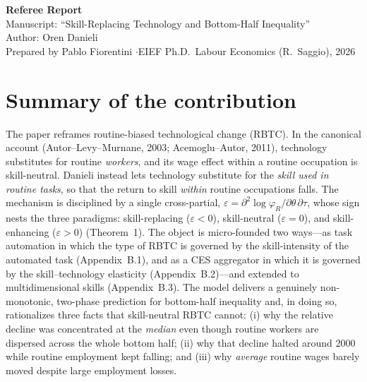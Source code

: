 \documentclass[11pt]{article}
\newcommand{\eps}{\varepsilon}
\begin{document}
\begin{center}
{\Large\bfseries Referee Report}\\[5pt]
{\large Manuscript: ``Skill-Replacing Technology and Bottom-Half Inequality''}\\[3pt]
{\normalsize Author: Oren Danieli}\\[7pt]
{\small Prepared by Pablo Fiorentini \quad$\cdot$\quad EIEF Ph.D.\ Labour Economics (R.\ Saggio), 2026}
\end{center}

\noindent\hrulefill

\section*{Summary of the contribution}

The paper reframes routine-biased technological change (RBTC). In the canonical account
(Autor--Levy--Murnane, 2003; Acemoglu--Autor, 2011), technology substitutes for routine
\emph{workers}, and its wage effect within a routine occupation is skill-neutral. Danieli instead
lets technology substitute for the \emph{skill used in routine tasks}, so that the return to skill
\emph{within} routine occupations falls. The mechanism is disciplined by a single cross-partial,
$\eps = \partial^2 \log \varphi_R / \partial\theta\,\partial\tau$, whose sign nests the three
paradigms: skill-replacing ($\eps<0$), skill-neutral ($\eps=0$), and skill-enhancing ($\eps>0$)
(Theorem~1). The object is micro-founded two ways---as task automation in which the type of RBTC
is governed by the skill-intensity of the automated task (Appendix~B.1), and as a CES aggregator in
which it is governed by the skill--technology elasticity (Appendix~B.2)---and extended to
multidimensional skills (Appendix~B.3). The model delivers a genuinely non-monotonic, two-phase
prediction for bottom-half inequality and, in doing so, rationalizes three facts that skill-neutral
RBTC cannot: (i) why the relative decline was concentrated at the \emph{median} even though routine
workers are dispersed across the whole bottom half; (ii) why that decline halted around 2000 while
routine employment kept falling; and (iii) why \emph{average} routine wages barely moved despite
large employment losses.
\end{document}
